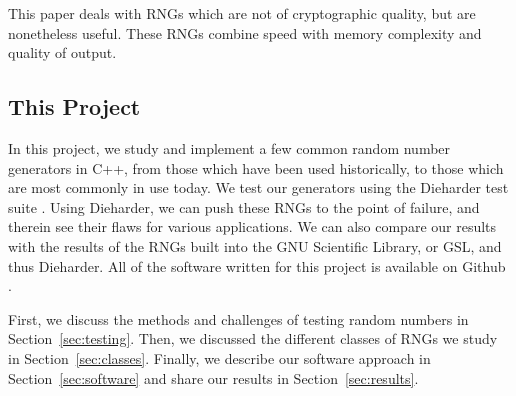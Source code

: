 This paper deals with RNGs which are not of cryptographic quality, but are nonetheless useful. These RNGs combine speed with memory complexity and quality of output.

\subsection{This Project}
In this project, we study and implement a few common random number generators in C++, from those which have been used historically, to those which are most commonly in use today. We test our generators using the Dieharder test suite \cite{dieharder_website}. Using Dieharder, we can push these RNGs to the point of failure, and therein see their flaws for various applications. We can also compare our results with the results of the RNGs built into the GNU Scientific Library, or GSL, and thus Dieharder. All of the software written for this project is available on Github \cite{github_repo}.

First, we discuss the methods and challenges of testing random numbers in Section~\ref{sec:testing}. Then, we discussed the different classes of RNGs we study in Section~\ref{sec:classes}. Finally, we describe our software approach in Section~\ref{sec:software} and share our results in Section~\ref{sec:results}.

